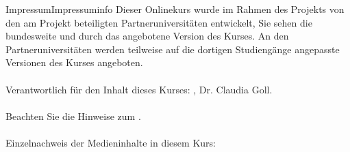 \begin{MXContent}{Impressum}{Impressum}{info}
Dieser Onlinekurs wurde im Rahmen des Projekts  von den am Projekt beteiligten Partneruniversitäten entwickelt,
Sie sehen die bundesweite und durch das  angebotene Version des Kurses. An den Partneruniversitäten
werden teilweise auf die dortigen Studiengänge angepasste Versionen des Kurses angeboten.
\ \\ \ \\
Verantwortlich für den Inhalt dieses Kurses: , Dr. Claudia Goll. 
\ \\ \ \\
Beachten Sie die Hinweise zum .
\ \\ \ \\
Einzelnachweis der Medieninhalte in diesem Kurs:\ \\
\MCopyrightCollection



\end{MXContent}

